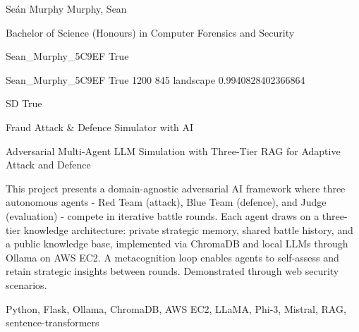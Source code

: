 \documentclass[twoside]{report}
\begin{document}
\begingroup{}\relax



\def\Key{Sean_Murphy_5C9EF}

{Seán Murphy}
{Murphy, Sean}

{Bachelor of Science (Honours) in Computer Forensics and Security}

{Sean_Murphy_5C9EF}
{True}

{Sean_Murphy_5C9EF}
{True}
{1200}
{845}
{landscape}
{0.9940828402366864}

{SD}
{True}

{Fraud Attack \& Defence Simulator with AI}

{Adversarial Multi-Agent LLM Simulation with Three-Tier RAG for Adaptive Attack and Defence}

{This project presents a domain-agnostic adversarial AI framework where three autonomous agents - Red Team (attack), Blue Team (defence), and Judge (evaluation) - compete in iterative battle rounds. Each agent draws on a three-tier knowledge architecture: private strategic memory, shared battle history, and a public knowledge base, implemented via ChromaDB and local LLMs through Ollama on AWS EC2. A metacognition loop enables agents to self-assess and retain strategic insights between rounds. Demonstrated through web security scenarios.}

{Python, Flask, Ollama, ChromaDB, AWS EC2, LLaMA, Phi-3, Mistral, RAG, sentence-transformers}
\end{document}
